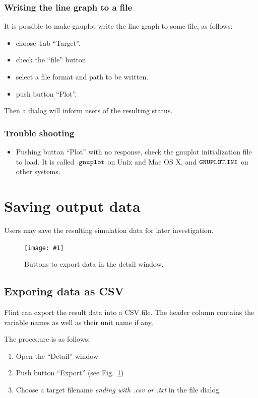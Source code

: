 \documentclass[a4paper,10pt]{report}
\newcommand\FigureOfImage[2]{\begin{figure}[h]
  \centering
  \texttt{[image: \#1]}
  \caption{#2}\label{fig:#1}
\end{figure}}
\begin{document}
\subsubsection{Writing the line graph to a file}
It is possible to make gnuplot write the line graph to some file, as follows:
\begin{itemize}
\item choose Tab ``Target''.
\item check the ``file'' button.
\item select a file format and path to be written.
\item push button ``Plot''.
\end{itemize}
Then a dialog will inform users of the resulting status.

\subsubsection{Trouble shooting}
\begin{itemize}
\item Pushing button ``Plot'' with no response, check the gnuplot initialization
  file to load. It is called $\tt{.gnuplot}$ on Unix and Mac OS X, and
  $\tt{GNUPLOT.INI}$ on other systems.
\end{itemize}

\section{Saving output data}
Users may save the resulting simulation data for later investigation.
\FigureOfImage{lr-detail-buttons}{Buttons to export data in the detail window.}

\subsection{Exporing data as CSV}
Flint can export the result data into a CSV file.
The header column contains the variable names as well as their unit name if any.

The procedure is as follows:
\begin{enumerate}
\item Open the ``Detail'' window
\item Push button ``Export'' (see Fig.~\ref{fig:lr-detail-buttons})
\item Choose a target filename \emph{ending with .csv or .txt} in the file dialog.
\end{enumerate}
\end{document}
